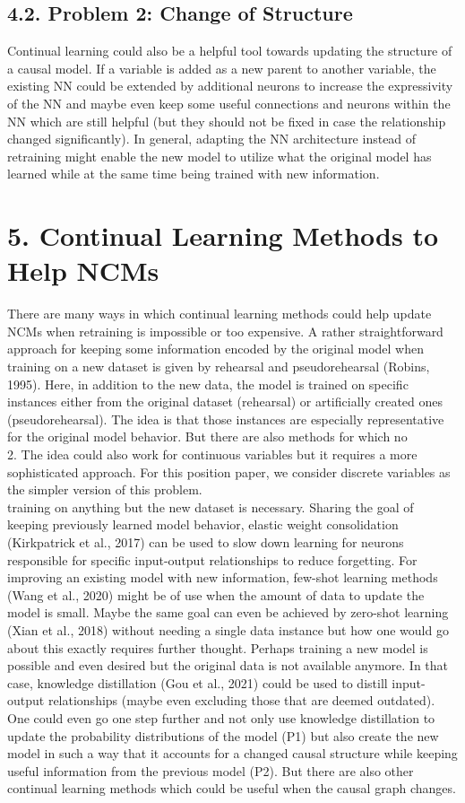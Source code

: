 \documentclass[10pt]{article}
\begin{document}
\subsection*{4.2. Problem 2: Change of Structure}
Continual learning could also be a helpful tool towards updating the structure of a causal model. If a variable is added as a new parent to another variable, the existing NN could be extended by additional neurons to increase the expressivity of the NN and maybe even keep some useful connections and neurons within the NN which are still helpful (but they should not be fixed in case the relationship changed significantly). In general, adapting the NN architecture instead of retraining might enable the new model to utilize what the original model has learned while at the same time being trained with new information.

\section*{5. Continual Learning Methods to Help NCMs}
There are many ways in which continual learning methods could help update NCMs when retraining is impossible or too expensive. A rather straightforward approach for keeping some information encoded by the original model when training on a new dataset is given by rehearsal and pseudorehearsal (Robins, 1995). Here, in addition to the new data, the model is trained on specific instances either from the original dataset (rehearsal) or artificially created ones (pseudorehearsal). The idea is that those instances are especially representative for the original model behavior. But there are also methods for which no\\
2. The idea could also work for continuous variables but it requires a more sophisticated approach. For this position paper, we consider discrete variables as the simpler version of this problem.\\
training on anything but the new dataset is necessary. Sharing the goal of keeping previously learned model behavior, elastic weight consolidation (Kirkpatrick et al., 2017) can be used to slow down learning for neurons responsible for specific input-output relationships to reduce forgetting. For improving an existing model with new information, few-shot learning methods (Wang et al., 2020) might be of use when the amount of data to update the model is small. Maybe the same goal can even be achieved by zero-shot learning (Xian et al., 2018) without needing a single data instance but how one would go about this exactly requires further thought. Perhaps training a new model is possible and even desired but the original data is not available anymore. In that case, knowledge distillation (Gou et al., 2021) could be used to distill input-output relationships (maybe even excluding those that are deemed outdated). One could even go one step further and not only use knowledge distillation to update the probability distributions of the model (P1) but also create the new model in such a way that it accounts for a changed causal structure while keeping useful information from the previous model (P2). But there are also other continual learning methods which could be useful when the causal graph changes.
\end{document}

